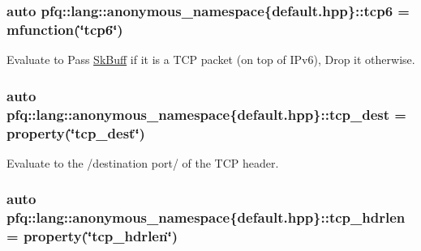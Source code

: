 \hypertarget{namespacepfq_1_1lang_1_1anonymous__namespace_02default_8hpp_03_ad5806a9b77c5975d08f0d0d317faa7a0}{
\subsubsection[{tcp6}]{\setlength{\rightskip}{0pt plus 5cm}auto pfq\+::lang\+::anonymous\+\_\+namespace\{default.\+hpp\}\+::tcp6 = {\bf mfunction}(\char`\"{}tcp6\char`\"{})}}\label{namespacepfq_1_1lang_1_1anonymous__namespace_02default_8hpp_03_ad5806a9b77c5975d08f0d0d317faa7a0}


Evaluate to {\ttfamily Pass} \hyperlink{structpfq_1_1lang_1_1SkBuff}{Sk\+Buff} if it is a T\+C\+P packet (on top of I\+Pv6), {\ttfamily Drop} it otherwise. 

\hypertarget{namespacepfq_1_1lang_1_1anonymous__namespace_02default_8hpp_03_a83741c074712431d2e75f09744bb7486}{
\subsubsection[{tcp\+\_\+dest}]{\setlength{\rightskip}{0pt plus 5cm}auto pfq\+::lang\+::anonymous\+\_\+namespace\{default.\+hpp\}\+::tcp\+\_\+dest = {\bf property}(\char`\"{}tcp\+\_\+dest\char`\"{})}}\label{namespacepfq_1_1lang_1_1anonymous__namespace_02default_8hpp_03_a83741c074712431d2e75f09744bb7486}


Evaluate to the /destination port/ of the T\+C\+P header. 

\hypertarget{namespacepfq_1_1lang_1_1anonymous__namespace_02default_8hpp_03_a678163384b58e4682bdbaf7efdd22cfb}{
\subsubsection[{tcp\+\_\+hdrlen}]{\setlength{\rightskip}{0pt plus 5cm}auto pfq\+::lang\+::anonymous\+\_\+namespace\{default.\+hpp\}\+::tcp\+\_\+hdrlen = {\bf property}(\char`\"{}tcp\+\_\+hdrlen\char`\"{})}}\label{namespacepfq_1_1lang_1_1anonymous__namespace_02default_8hpp_03_a678163384b58e4682bdbaf7efdd22cfb}



